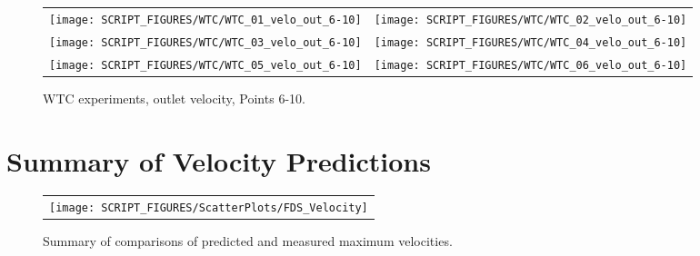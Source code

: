 \begin{figure}[p]
\begin{tabular*}{\textwidth}{l@{\extracolsep{\fill}}r}
\texttt{[image: SCRIPT\_FIGURES/WTC/WTC\_01\_velo\_out\_6-10]} &
\texttt{[image: SCRIPT\_FIGURES/WTC/WTC\_02\_velo\_out\_6-10]} \\
\texttt{[image: SCRIPT\_FIGURES/WTC/WTC\_03\_velo\_out\_6-10]} &
\texttt{[image: SCRIPT\_FIGURES/WTC/WTC\_04\_velo\_out\_6-10]} \\
\texttt{[image: SCRIPT\_FIGURES/WTC/WTC\_05\_velo\_out\_6-10]} &
\texttt{[image: SCRIPT\_FIGURES/WTC/WTC\_06\_velo\_out\_6-10]}
\end{tabular*}
\caption{WTC experiments, outlet velocity, Points 6-10.}
\label{WTC_velo_out_6-10}
\end{figure}



\clearpage

\section{Summary of Velocity Predictions}
\label{Velocity}

\begin{figure}[h!]
\begin{center}
\begin{tabular}{l}
\texttt{[image: SCRIPT\_FIGURES/ScatterPlots/FDS\_Velocity]}
\end{tabular}
\end{center}
\caption[Summary of velocity predictions]
{Summary of comparisons of predicted and measured maximum velocities.}
\label{Steckler_Scatterplot}
\end{figure}


